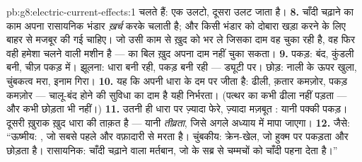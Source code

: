 \begin{solution}{pb:g8:electric-current-effects:1}
चलते हैं: एक उलटो, दूसरा उलट जाता है।
\textbf{8.}  चाँदी चढ़ाने का काम अपना रासायनिक भंडार
\emph{ख़र्च} करके चलाती है; और किसी भंडार को दोबारा खड़ा करने के लिए
बाहर से मजबूर की गई  चाहिए। जो  उसी काम से ख़ुद को भर ले
जिसका दाम वह चुका रही है, वह फिर वही हमेशा चलने वाली मशीन है ---
 का बिल ख़ुद अपना दाम नहीं चुका सकता।
\textbf{9.} पकड़:  बंद, कुंडली  बनी, चीज़ पकड़ में। झूलना:
धारा बनी रही, पकड़ बनी रही ---  ड्यूटी पर। छोड़:
नाली के ऊपर  खुला, चुंबकत्व मरा, इनाम गिरा।
\textbf{10.} यह कि  अपनी धारा के दम पर जीता है: 
ढीली, क़तार कमज़ोर, पकड़ कमज़ोर --- चालू-बंद होने की सुविधा का दाम है
यही निर्भरता। (पत्थर का  कभी ढीला नहीं पड़ता --- और कभी छोड़ता
भी नहीं।)
\textbf{11.} उतनी ही धारा पर ज़्यादा फेरे, ज़्यादा मज़बूत : यानी
पक्की पकड़। दूसरी ख़ुराक ख़ुद धारा की ताक़त है --- यानी \emph{तीव्रता},
जिसे अगले अध्याय में मापा जाएगा।
\textbf{12.} जैसे: ``ऊष्मीय: , जो सबसे पहले और वफ़ादारी से
मरता है। चुंबकीय: क्रेन-खेल, जो हुक्म पर पकड़ता और छोड़ता है।
रासायनिक: चाँदी चढ़ाने वाला मर्तबान, जो  के सब्र से चम्मचों को
चाँदी पहना देता है।''
\end{solution}
